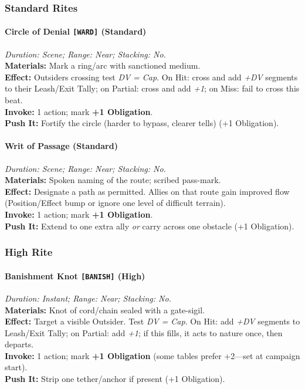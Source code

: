 \subsubsection*{Standard Rites}

\paragraph{Circle of Denial \texttt{[WARD]} (Standard)}
\emph{Duration: Scene; Range: Near; Stacking: No.}\\
\textbf{Materials:} Mark a ring/arc with sanctioned medium.\\
\textbf{Effect:} Outsiders crossing test \emph{DV = Cap}. On Hit: cross and add \emph{+DV} segments to their Leash/Exit Tally; on Partial: cross and add \emph{+1}; on Miss: fail to cross this beat.\\
\textbf{Invoke:} 1 action; mark \textbf{+1 Obligation}.\\
\textbf{Push It:} Fortify the circle (harder to bypass, clearer tells) (+1 Obligation).

\paragraph{Writ of Passage (Standard)}
\emph{Duration: Scene; Range: Near; Stacking: No.}\\
\textbf{Materials:} Spoken naming of the route; scribed pass-mark.\\
\textbf{Effect:} Designate a path as permitted. Allies on that route gain improved flow (Position/Effect bump or ignore one level of difficult terrain).\\
\textbf{Invoke:} 1 action; mark \textbf{+1 Obligation}.\\
\textbf{Push It:} Extend to one extra ally \emph{or} carry across one obstacle (+1 Obligation).

\subsubsection*{High Rite}

\paragraph{Banishment Knot \texttt{[BANISH]} (High)}
\emph{Duration: Instant; Range: Near; Stacking: No.}\\
\textbf{Materials:} Knot of cord/chain sealed with a gate-sigil.\\
\textbf{Effect:} Target a visible Outsider. Test \emph{DV = Cap}. On Hit: add \emph{+DV} segments to Leash/Exit Tally; on Partial: add \emph{+1}; if this fills, it acts to nature once, then departs.\\
\textbf{Invoke:} 1 action; mark \textbf{+1 Obligation} (some tables prefer +2—set at campaign start).\\
\textbf{Push It:} Strip one tether/anchor if present (+1 Obligation).

